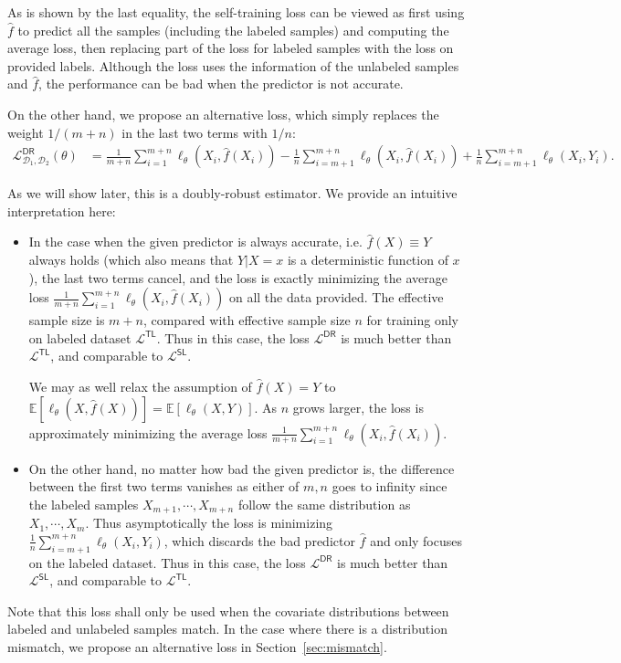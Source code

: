 As is shown by the last equality, the self-training loss can be viewed as first using $\hat f$ to predict all the samples (including the labeled samples) and computing the average loss, then replacing part of the loss for labeled samples  with the loss on provided labels. Although the loss uses the information of the unlabeled samples and $\hat f$, the performance can be bad when the predictor is not accurate.

On the other hand, we propose an alternative loss, which simply replaces the weight $1/(m+n)$ in the last two terms with $1/n$:
\begin{align}
\mathcal{L}^{\mathsf{DR}}_{\mathcal{D}_1,\mathcal{D}_2}(\theta) 
& = \frac{1}{m+n}  \sum_{i=1}^{m+n} \ell_\theta(X_i, \hat f(X_i)) -  \frac{1}{n} \sum_{i=m+1}^{m+n} \ell_\theta(X_i, \hat f(X_i))  + \frac{1}{n} \sum_{i=m+1}^{m+n} \ell_\theta(X_i, Y_i).  \label{eq:dr}
\end{align}



As we will show later,  this is a doubly-robust estimator. We provide an intuitive interpretation here:
\begin{itemize}[leftmargin=24pt, itemsep=4pt]
    \vspace{-4pt}
    \item In the case when the given predictor is always accurate, i.e. $\hat f(X) \equiv Y$ always holds (which also means that $Y |X=x$ is a deterministic function of $x$), the last two terms cancel, and the loss is exactly minimizing the average loss  $\frac{1}{m+n}  \sum_{i=1}^{m+n} \ell_\theta(X_i, \hat f(X_i))$ on all the data provided.  The effective sample size is $m+n$, compared with effective sample size $n$ for training only on labeled dataset $\mathcal{L}^{\mathsf{TL}}$. Thus in this case, the loss $\mathcal{L}^{\mathsf{DR}}$ is much better than $\mathcal{L}^{\mathsf{TL}}$, and comparable to $\mathcal{L}^{\mathsf{SL}}$. 
    
    We may as well relax the assumption of $\hat f(X) = Y$  to $\mathbb{E}[\ell_\theta(X, \hat f(X))] = \mathbb{E}[\ell_\theta(X, Y)]$. As $n$ grows larger, the loss is  approximately minimizing the average loss  $\frac{1}{m+n}  \sum_{i=1}^{m+n} \ell_\theta(X_i, \hat f(X_i))$.
    \item On the other hand, no matter how bad  the  given predictor is,  the difference between the first two terms vanishes as either of  $m, n$ goes to infinity since the 
    labeled samples $X_{m+1},\cdots, X_{m+n}$ follow the same distribution as $X_1,\cdots, X_m$. Thus asymptotically the loss is minimizing $ \frac{1}{n} \sum_{i=m+1}^{m+n} \ell_\theta(X_i, Y_i)$, which discards the bad predictor $\hat f$  and only focuses on the labeled dataset. Thus in this case, the loss $\mathcal{L}^{\mathsf{DR}}$ is much better than $\mathcal{L}^{\mathsf{SL}}$, and comparable to $\mathcal{L}^{\mathsf{TL}}$.
\end{itemize}
Note that this loss shall only be used when the covariate distributions between labeled and unlabeled samples match. In the case where there is a distribution mismatch, we propose an alternative loss in Section~\ref{sec:mismatch}. 

